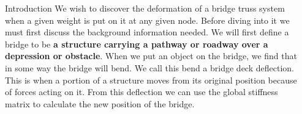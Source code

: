 \documentclass[final]{beamer}
\newlength{\onecolwid}
\newlength{\twocolwid}
\begin{document}
\begin{frame}[t]
\begin{columns}[t]
\begin{column}{\onecolwid}
\begin{block}{Introduction}
We wish to discover the deformation of a bridge truss system when a given weight is put on it at any given node. Before diving into it we must first discuss the background information needed. We will first define a bridge to be {\bf a structure carrying a pathway or roadway over a depression or obstacle}\cite{1}. When we put an object on the bridge, we find that in some way the bridge will bend. We call this bend a bridge deck deflection. This is {when a portion of a structure moves from its original position because of forces acting on it}\cite{2}.
From this deflection we can use the global stiffness matrix to calculate the new position of the bridge. 
\end{block}





\end{column} %

\begin{column}{\twocolwid} %



\end{column}
\end{columns}
\end{frame}
\end{document}

